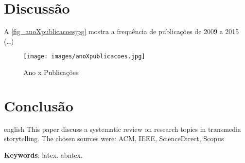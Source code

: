 \documentclass[
article,			%
11pt,				%
oneside,			%
a4paper,			%
english,			%
brazil,				%
sumario=tradicional
]{abntex2}
\begin{document}
  \section{Discussão}

  A \autoref{fig_anoXpublicacoesjpg} mostra a frequência de publicações de 2009 a 2015 (\ldots)

  \begin{figure}[htb]
    \caption{\label{fig_anoXpublicacoesjpg}Ano x Publicações}
    \begin{center}
      \texttt{[image: images/anoXpublicacoes.jpg]}
    \end{center}
  \end{figure}



  \section{Conclusão}


  \postextual



  \emptythanks
  \maketitle

  \renewcommand{\resumoname}{Abstract}
  \begin{resumoumacoluna}
    \begin{otherlanguage*}{english}
      This paper discuss a systematic review on research topics in transmedia storytelling. The chosen sources were: ACM, IEEE, ScienceDirect, Scopus

      \vspace{\onelineskip}

      \noindent
      \textbf{Keywords}: latex. abntex.
    \end{otherlanguage*}
  \end{resumoumacoluna}
\end{document}
